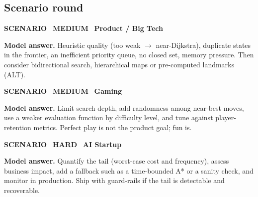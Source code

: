 \documentclass[11pt]{article}
\begin{document}
\subsection*{\color{leaf}Scenario round}
\begin{tcolorbox}[enhanced,breakable,colback=white,colframe=leaf,arc=2mm,boxrule=0.8pt,left=3mm,right=3mm,
 title={\textbf{QII.13}\quad Your A* search is slow on a large map. What do you check first?},fonttitle=\color{white}\small,colbacktitle=leaf]
\colorbox{leaf!15}{\scriptsize\bfseries\color{leaf} SCENARIO}\
\colorbox{gold!85!black!15}{\scriptsize\bfseries\color{gold!85!black} MEDIUM}\
\colorbox{navy!8}{\scriptsize\bfseries\color{navy} Product / Big Tech}\par\smallskip
\textbf{\color{navy}Model answer.} Heuristic quality (too weak $\to$ near-Dijkstra), duplicate states in the frontier, an inefficient priority queue, no closed set, memory pressure. Then consider bidirectional search, hierarchical maps or pre-computed landmarks (ALT).
\end{tcolorbox}
\begin{tcolorbox}[enhanced,breakable,colback=white,colframe=leaf,arc=2mm,boxrule=0.8pt,left=3mm,right=3mm,
 title={\textbf{QII.14}\quad An opponent AI is 'too perfect' and players quit. What do you change?},fonttitle=\color{white}\small,colbacktitle=leaf]
\colorbox{leaf!15}{\scriptsize\bfseries\color{leaf} SCENARIO}\
\colorbox{gold!85!black!15}{\scriptsize\bfseries\color{gold!85!black} MEDIUM}\
\colorbox{navy!8}{\scriptsize\bfseries\color{navy} Gaming}\par\smallskip
\textbf{\color{navy}Model answer.} Limit search depth, add randomness among near-best moves, use a weaker evaluation function by difficulty level, and tune against player-retention metrics. Perfect play is not the product goal; fun is.
\end{tcolorbox}
\begin{tcolorbox}[enhanced,breakable,colback=white,colframe=leaf,arc=2mm,boxrule=0.8pt,left=3mm,right=3mm,
 title={\textbf{QII.15}\quad A greedy heuristic gives good routes 95\% of the time but occasionally terrible ones. How do you decide whether to ship it?},fonttitle=\color{white}\small,colbacktitle=leaf]
\colorbox{leaf!15}{\scriptsize\bfseries\color{leaf} SCENARIO}\
\colorbox{crimson!15}{\scriptsize\bfseries\color{crimson} HARD}\
\colorbox{navy!8}{\scriptsize\bfseries\color{navy} AI Startup}\par\smallskip
\textbf{\color{navy}Model answer.} Quantify the tail (worst-case cost and frequency), assess business impact, add a fallback such as a time-bounded A* or a sanity check, and monitor in production. Ship with guard-rails if the tail is detectable and recoverable.
\end{tcolorbox}
\end{document}
